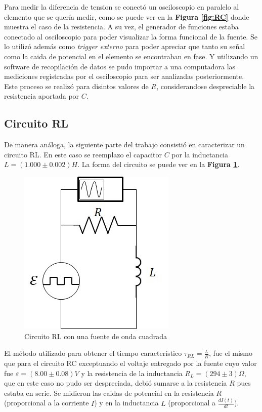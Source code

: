\documentclass[11pt,a4paper]{article}
\begin{document}
Para medir la diferencia de tension se conectó un osciloscopio en paralelo al elemento que se quería medir, como se puede ver en la \textbf{Figura \ref{fig:RC}} donde muestra el caso de la resistencia. A su vez, el generador de funciones estaba conectado al osciloscopio para poder visualizar la forma funcional de la fuente. Se lo utilizó además como \textit{trigger externo} para poder apreciar que tanto su señal como la caida de potencial en el elemento se encontraban en fase. Y utilizando un software de recopilación de datos se pudo importar a una computadora las mediciones registradas por el osciloscopio para ser analizadas posteriormente. Este proceso se realizó para disintos valores de $R$, considerandose despreciable la resistencia aportada por $C$.

\subsection{Circuito RL}

De manera análoga, la siguiente parte del trabajo consistió en caracterizar un circuito RL. En este caso se reemplazo el capacitor $C$ por la inductancia $L = (1.000 \pm 0.002) H$. La forma del circuito se puede ver en la \textbf{Figura \ref{fig:RL}}.

\begin{figure}[h]
\centering
\includegraphics[scale=0.7]{Circuito-RL}
  \caption{Circuito RL con una fuente de onda cuadrada}
  \label{fig:RL}
\end{figure}

El método utilizado para obtener el tiempo característico $\tau_{RL} = \frac{L}{R}$, fue el mismo que para el circuito RC exceptuando el voltaje entregado por la fuente cuyo valor fue $\varepsilon = (8.00 \pm 0.08)V$ y la resistencia de la inductancia $R_L = (294 \pm 3) \Omega$, que en este caso no pudo ser despreciada, debió sumarse a la resistencia $R$ pues estaba en serie. Se midieron las caidas de potencial en la resistencia $R$ (proporcional a la corriente $I$) y en la inductancia $L$ (proporcional a $\frac{dI(t)}{dt}$).
\end{document}
